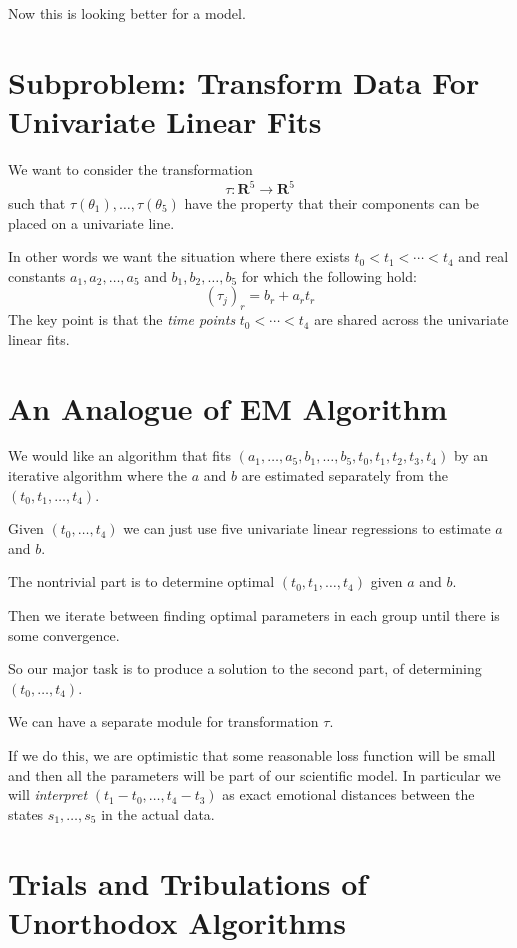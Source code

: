 \documentclass{amsart}
\begin{document}
Now this is looking better for a model.   

\section{Subproblem: Transform Data For Univariate Linear Fits}

We want to consider the transformation
\[
\tau: \mathbf{R}^5 \rightarrow \mathbf{R}^5
\]
such that $\tau(\theta_1),\dots, \tau(\theta_5)$ have the property that their components can be placed on a univariate line.

In other words we want the situation where there exists $t_0<t_1<\cdots<t_4$ and real constants $a_1, a_2, \dots, a_5$ and $b_1,b_2,\dots,b_5$ for which the following hold:
\[
(\tau_j)_r = b_r + a_r t_r
\]
The key point is that the {\em time points} $t_0<\cdots<t_4$ are shared across the univariate linear fits.

\section{An Analogue of EM Algorithm}

We would like an algorithm that fits $(a_1,\dots,a_5,b_1,\dots,b_5, t_0,t_1,t_2,t_3,t_4)$ by an iterative algorithm where the $a$ and $b$ are estimated separately from the $(t_0,t_1,\dots,t_4)$.  

Given $(t_0,\dots,t_4)$ we can just use five univariate linear regressions to estimate $a$ and $b$.  

The nontrivial part is to determine optimal $(t_0,t_1,\dots,t_4)$ given $a$ and $b$.

Then we iterate between finding optimal parameters in each group until there is some convergence.

So our major task is to produce a solution to the second part, of determining $(t_0,\dots,t_4)$.

We can have a separate module for transformation $\tau$.

If we do this, we are optimistic that some reasonable loss function will be small and then all the parameters will be part of our scientific model.  In particular we will {\em interpret} $(t_1-t_0,\dots,t_4-t_3)$ as exact emotional distances between the states $s_1,\dots,s_5$ in the actual data.

\section{Trials and Tribulations of Unorthodox Algorithms}
\end{document}

